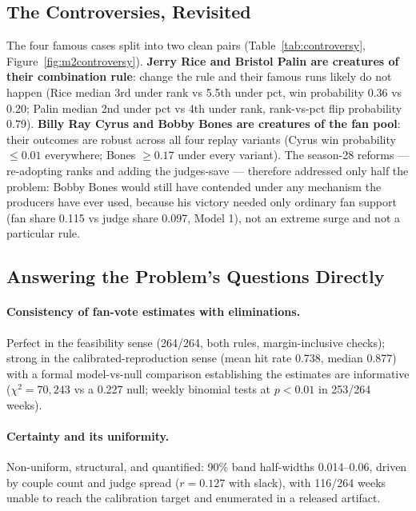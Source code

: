 \documentclass[11pt]{article}
\begin{document}
\subsection{The Controversies, Revisited}

The four famous cases split into two clean pairs (Table~\ref{tab:controversy},
Figure~\ref{fig:m2controversy}). \textbf{Jerry Rice and Bristol Palin are creatures of
their combination rule}: change the rule and their famous runs likely do not happen
(Rice median 3rd under rank vs 5.5th under pct, win probability 0.36 vs 0.20; Palin
median 2nd under pct vs 4th under rank, rank-vs-pct flip probability 0.79).
\textbf{Billy Ray Cyrus and Bobby Bones are creatures of the fan pool}: their outcomes
are robust across all four replay variants (Cyrus win probability $\le 0.01$
everywhere; Bones $\ge 0.17$ under every variant). The season-28 reforms --- re-adopting
ranks and adding the judges-save --- therefore addressed only half the problem: Bobby
Bones would still have contended under any mechanism the producers have ever used,
because his victory needed only ordinary fan support (fan share 0.115 vs judge share
0.097, Model 1), not an extreme surge and not a particular rule.

\subsection{Answering the Problem's Questions Directly}

\paragraph{Consistency of fan-vote estimates with eliminations.} Perfect in the
feasibility sense (264/264, both rules, margin-inclusive checks); strong in the
calibrated-reproduction sense (mean hit rate 0.738, median 0.877) with a formal
model-vs-null comparison establishing the estimates are informative ($\chi^2 = 70{,}243$
vs a 0.227 null; weekly binomial tests at $p<0.01$ in 253/264 weeks).

\paragraph{Certainty and its uniformity.} Non-uniform, structural, and quantified:
90\% band half-widths 0.014--0.06, driven by couple count and judge spread ($r = 0.127$
with slack), with 116/264 weeks unable to reach the calibration target and enumerated
in a released artifact.
\end{document}
